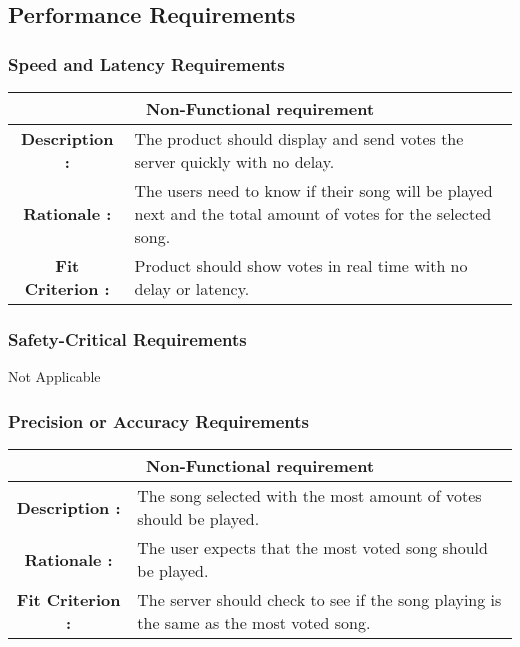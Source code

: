 \documentclass[12pt, titlepage]{article}
\begin{document}
\subsection{Performance Requirements}
\subsubsection{Speed and Latency Requirements}

\begin{center}
\begin{table}[H]
\begin{tabularx}{\textwidth}{| c X |}
\hline
\multicolumn{2}{|c|}{\textbf{Non-Functional requirement}}\\
\hline
\textbf{Description : } &The product should display and send votes the server quickly with no delay.\\
\hline
\textbf{Rationale : } & The users need to know if their song will be played next and the total amount of votes for the selected song.\\
\hline
\textbf{Fit Criterion : } & Product should show votes in real time with no delay or latency.\\
\hline
\end{tabularx}
\end{table}
\end{center}


\subsubsection{Safety-Critical Requirements}
Not Applicable
\subsubsection{Precision or Accuracy Requirements}

\begin{center}
\begin{table}[H]
\begin{tabularx}{\textwidth}{| c X |}
\hline
\multicolumn{2}{|c|}{\textbf{Non-Functional requirement}}\\
\hline
\textbf{Description : } &The song selected with the most amount of votes should be played.\\
\hline
\textbf{Rationale : } & The user expects that the most voted song should be played.\\
\hline
\textbf{Fit Criterion : } & The server should check to see if the song playing is the same as the most voted song.\\
\hline
\end{tabularx}
\end{table}
\end{center}
\end{document}
